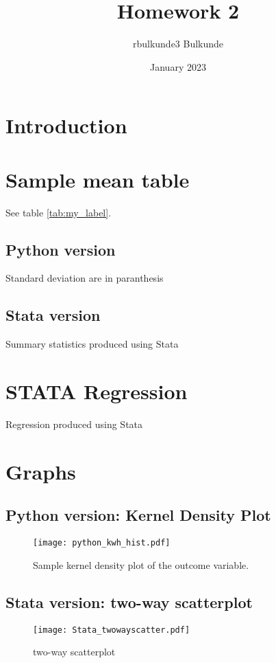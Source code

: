 \documentclass{article}
\title{Homework 2}
\author{rbulkunde3 Bulkunde}
\date{January 2023}
\begin{document}
\maketitle

\section{Introduction}
\section{Sample mean table}
 See table \ref{tab:my_label}.

\subsection{Python version}

\begin{table}[ht]
    \centering
    
    \caption{Standard deviation are in paranthesis}
    \label{tab:my_label}
\end{table}

\subsection{Stata version}

\begin{table}[ht]
    \centering
    
    \caption{Summary statistics produced using Stata}
    \label{tab:statasummary}
\end{table}

\section{STATA Regression}
\begin{table}[ht]
    \centering
    
    \caption{Regression produced using Stata}
    \label{tab:Regression}
\end{table}

\section{Graphs}

\subsection{Python version: Kernel Density Plot}

\begin{figure}[ht]
    \centering
    \texttt{[image: python\_kwh\_hist.pdf]}
    \caption{Sample kernel density plot of the outcome variable.}
    \label{fig:samplehist}
\end{figure}

\subsection{Stata version: two-way scatterplot}

\begin{figure}[ht]
    \centering
    \texttt{[image: Stata\_twowayscatter.pdf]}
    \caption{two-way scatterplot}
    \label{fig:statahist}
\end{figure}
\end{document}
